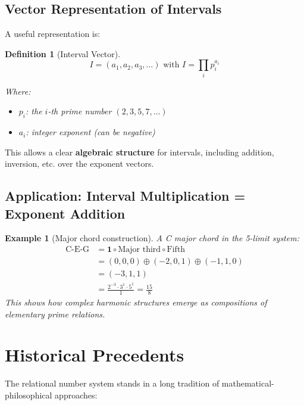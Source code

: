 \documentclass[11pt,a4paper]{article}
\newcommand{\primrel}[1]{\mathbf{#1}}
\newtheorem{definition}{Definition}[section]
\newtheorem{example}{Example}[section]
\begin{document}
	\subsection{Vector Representation of Intervals}
	
	A useful representation is:
	
	\begin{definition}[Interval Vector]
		\begin{equation}
			I = (a_1, a_2, a_3, \ldots) \text{ with } I = \prod_{i} p_i^{a_i}
		\end{equation}
		
		Where:
		\begin{itemize}
			\item $p_i$: the $i$-th prime number $(2, 3, 5, 7, \ldots)$
			\item $a_i$: integer exponent (can be negative)
		\end{itemize}
	\end{definition}
	
	This allows a clear \textbf{algebraic structure} for intervals, including addition, inversion, etc. over the exponent vectors.
	
	\subsection{Application: Interval Multiplication = Exponent Addition}
	
	\begin{example}[Major chord construction]
		A C major chord in the 5-limit system:
		\begin{align}
			\text{C-E-G} &= \primrel{1} \circ \text{Major third} \circ \text{Fifth} \\
			&= (0,0,0) \oplus (-2,0,1) \oplus (-1,1,0) \\
			&= (-3,1,1) \\
			&= \frac{2^{-3} \cdot 3^1 \cdot 5^1}{1} = \frac{15}{8}
		\end{align}
		This shows how complex harmonic structures emerge as compositions of elementary prime relations.
	\end{example}
	
	\section{Historical Precedents}
	
	The relational number system stands in a long tradition of mathematical-philosophical approaches:
	
\end{document}
